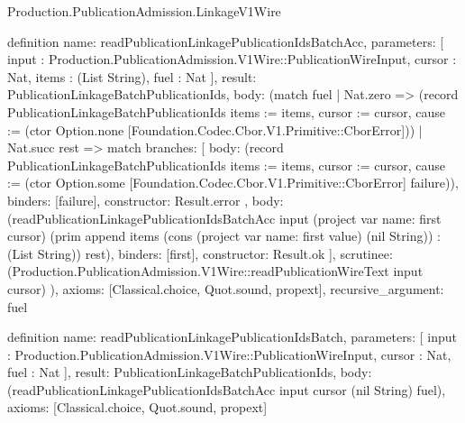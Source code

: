 \begin{lexlean}{Production.PublicationAdmission.LinkageV1Wire}
\begin{semanticmodule}
definition{
  name: readPublicationLinkagePublicationIdsBatchAcc,
  parameters: [
    input : Production.PublicationAdmission.V1Wire::PublicationWireInput,
    cursor : Nat,
    items : (List String),
    fuel : Nat
  ],
  result: PublicationLinkageBatchPublicationIds,
  body: (match fuel
    | Nat.zero => (record PublicationLinkageBatchPublicationIds {items := items, cursor := cursor, cause := (ctor Option.none [Foundation.Codec.Cbor.V1.Primitive::CborError])})
    | Nat.succ rest => match{
      branches: [
        {
          body: (record PublicationLinkageBatchPublicationIds {items := items, cursor := cursor, cause := (ctor Option.some [Foundation.Codec.Cbor.V1.Primitive::CborError] failure)}),
          binders: [failure],
          constructor: Result.error
        },
        {
          body: (readPublicationLinkagePublicationIdsBatchAcc input (project var{
            name: first
          } cursor) (prim append items (cons (project var{
            name: first
          } value) (nil String)) : (List String)) rest),
          binders: [first],
          constructor: Result.ok
        }
      ],
      scrutinee: (Production.PublicationAdmission.V1Wire::readPublicationWireText input cursor)
    }),
  axioms: [Classical.choice, Quot.sound, propext],
  recursive_argument: fuel
}

definition{
  name: readPublicationLinkagePublicationIdsBatch,
  parameters: [
    input : Production.PublicationAdmission.V1Wire::PublicationWireInput,
    cursor : Nat,
    fuel : Nat
  ],
  result: PublicationLinkageBatchPublicationIds,
  body: (readPublicationLinkagePublicationIdsBatchAcc input cursor (nil String) fuel),
  axioms: [Classical.choice, Quot.sound, propext]
}


\end{semanticmodule}
\end{lexlean}
